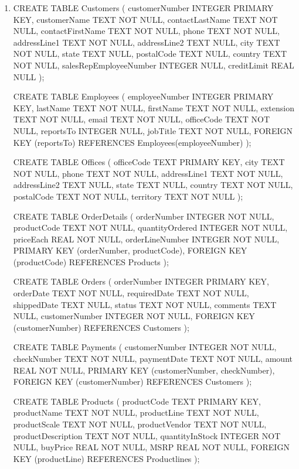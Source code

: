 





\begin{enumerate}
  
  \item 
  CREATE TABLE Customers (
    customerNumber INTEGER PRIMARY KEY,
    customerName TEXT NOT NULL,
    contactLastName TEXT NOT NULL,
    contactFirstName TEXT NOT NULL,
    phone TEXT NOT NULL,
    addressLine1 TEXT NOT NULL,
    addressLine2 TEXT NULL,
    city TEXT NOT NULL,
    state TEXT NULL,
    postalCode TEXT NULL,
    country TEXT NOT NULL,
    salesRepEmployeeNumber INTEGER NULL,
    creditLimit REAL NULL
  );

  CREATE TABLE Employees (
    employeeNumber INTEGER PRIMARY KEY,
    lastName TEXT NOT NULL,
    firstName TEXT NOT NULL,
    extension TEXT NOT NULL,
    email TEXT NOT NULL,
    officeCode TEXT NOT NULL,
    reportsTo INTEGER NULL,
    jobTitle TEXT NOT NULL,
    FOREIGN KEY (reportsTo) REFERENCES Employees(employeeNumber)
  );

  CREATE TABLE Offices (
    officeCode TEXT PRIMARY KEY,
    city TEXT NOT NULL,
    phone TEXT NOT NULL,
    addressLine1 TEXT NOT NULL,
    addressLine2 TEXT NULL,
    state TEXT NULL,
    country TEXT NOT NULL,
    postalCode TEXT NOT NULL,
    territory TEXT NOT NULL
  );

  CREATE TABLE OrderDetails (
    orderNumber INTEGER NOT NULL,
    productCode TEXT NOT NULL,
    quantityOrdered INTEGER NOT NULL,
    priceEach REAL NOT NULL,
    orderLineNumber INTEGER NOT NULL,
    PRIMARY KEY (orderNumber, productCode),
    FOREIGN KEY (productCode) REFERENCES Products
  );

  CREATE TABLE Orders (
    orderNumber INTEGER PRIMARY KEY,
    orderDate TEXT NOT NULL,
    requiredDate TEXT NOT NULL,
    shippedDate TEXT NULL,
    status TEXT NOT NULL,
    comments TEXT NULL,
    customerNumber INTEGER NOT NULL,
    FOREIGN KEY (customerNumber) REFERENCES Customers
  );

  CREATE TABLE Payments (
    customerNumber INTEGER NOT NULL,  
    checkNumber TEXT NOT NULL,
    paymentDate TEXT NOT NULL,
    amount REAL NOT NULL,
    PRIMARY KEY (customerNumber, checkNumber),
    FOREIGN KEY (customerNumber) REFERENCES Customers
  );

  CREATE TABLE Products (
    productCode TEXT PRIMARY KEY,
    productName TEXT NOT NULL,
    productLine TEXT NOT NULL,
    productScale TEXT NOT NULL,
    productVendor TEXT NOT NULL,
    productDescription TEXT NOT NULL,
    quantityInStock INTEGER NOT NULL,
    buyPrice REAL NOT NULL,
    MSRP REAL NOT NULL,
    FOREIGN KEY (productLine) REFERENCES Productlines
  );


\end{enumerate}
